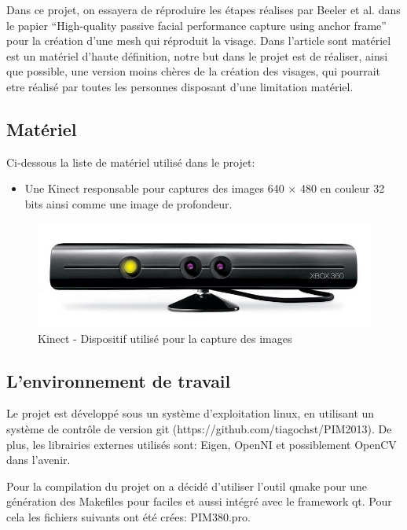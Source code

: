 \documentclass[a4paper,11pt]{article}
\begin{document}
Dans ce projet, on essayera de réproduire les étapes réalises par Beeler et al. dans le papier ``High-quality passive facial performance capture using anchor frame'' pour la création d'une mesh qui réproduit la visage.
Dans l'article sont matériel est un matériel d'haute définition, notre but dans le projet est de réaliser, ainsi que possible, une version moins chères de la création des visages, qui pourrait etre réalisé par toutes les personnes disposant d'une limitation matériel.

\subsection{Matériel}

Ci-dessous la liste de matériel utilisé dans le projet: 

\begin{itemize}
\item Une Kinect responsable pour captures des images 640 × 480 en couleur 32 bits ainsi comme une image de profondeur. 
\end{itemize}

\begin{figure}[h!]
  \begin{center}
    \includegraphics[scale=0.2]{img/kinect.jpg}
    \caption{Kinect - Dispositif utilisé pour la capture des images}
  \end{center}
\end{figure}

\subsection{L'environnement de travail}

Le projet est développé sous un système d'exploitation linux, en utilisant un système de contrôle de version git (https://github.com/tiagochst/PIM2013). 
De plus, les librairies externes utilisés sont: Eigen, OpenNI et possiblement OpenCV dans l’avenir.

Pour la compilation du projet on a décidé d’utiliser l’outil qmake pour une génération des Makefiles pour faciles et aussi intégré avec le framework qt. 
Pour cela les fichiers suivants ont été crées: PIM380.pro. 
\end{document}
